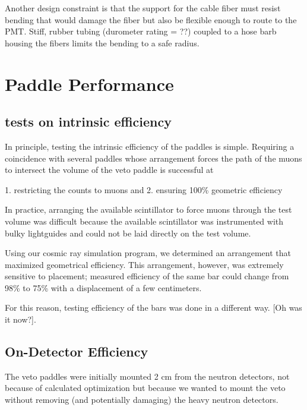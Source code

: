Another design constraint is that the support for the cable fiber must resist bending that would damage the fiber but also be flexible enough to route to the PMT.  Stiff, rubber tubing (durometer rating = ??) coupled to a hose barb housing the fibers limits the bending to a safe radius.



\section{Paddle Performance}
\subsection{tests on intrinsic efficiency}

In principle, testing the intrinsic efficiency of the paddles is simple.  Requiring a coincidence with several paddles whose arrangement forces the path of the muons to intersect the volume of the veto paddle is successful at 

1. restricting the counts to muons and
2. ensuring 100\% geometric efficiency

In practice, arranging the available scintillator to force muons through the test volume was difficult because the available scintillator was instrumented with bulky lightguides and could not be laid directly on the test volume.

Using our cosmic ray simulation program, we determined an arrangement that maximized geometrical efficiency.  This arrangement, however, was extremely sensitive to placement; measured efficiency of the same bar could change from 98\% to 75\% with a displacement of a few centimeters.

For this reason, testing efficiency of the bars was done in a different way.  [Oh was it now?].

\subsection{On-Detector Efficiency}

The veto paddles were initially mounted 2 cm from the neutron detectors, not because of calculated optimization but because we wanted to mount the veto without removing (and potentially damaging) the heavy neutron detectors.


